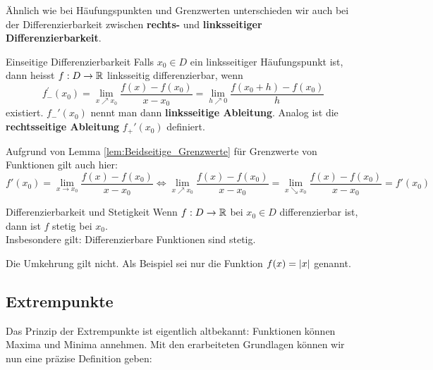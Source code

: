 Ähnlich wie bei Häufungspunkten und Grenzwerten unterschieden wir auch bei der Differenzierbarkeit zwischen \textbf{rechts-} und \textbf{linksseitiger Differenzierbarkeit}. 
\begin{definition}{Einseitige Differenzierbarkeit}{}
Falls $x_0 \in D$ ein linksseitiger Häufungspunkt ist, dann heisst $f:D \to \mathbb{R}$ linksseitig differenzierbar, wenn
$$f_{-}^{\prime}\left(x_{0}\right)=\lim _{x \nearrow x_{0}} \frac{f(x)-f\left(x_{0}\right)}{x-x_{0}}=\lim _{h \nearrow 0} \frac{f\left(x_{0}+h\right)-f\left(x_{0}\right)}{h}$$
existiert. $f_-'(x_0)$ nennt man dann \textbf{linksseitige Ableitung}. Analog ist die \textbf{rechtsseitige Ableitung} $f_+'(x_0)$ definiert.
\end{definition}
\begin{remark}
Aufgrund von Lemma \ref{lem:Beidseitige_Grenzwerte} für Grenzwerte von Funktionen gilt auch hier: $$f'(x_0)=\lim_{x \to x_0}\frac{f(x)-f(x_0)}{x-x_0} \Longleftrightarrow \lim_{x \nearrow x_0}\frac{f(x)-f\left(x_{0}\right)}{x-x_{0}} = \lim_{x \searrow x_0}\frac{f(x)-f\left(x_{0}\right)}{x-x_{0}}=f'(x_0)$$
\end{remark}
\begin{lemma}{Differenzierbarkeit und Stetigkeit}{}
Wenn $f:D \to \mathbb{R}$ bei $x_0 \in D$ differenzierbar ist, dann ist $f$ stetig bei $x_0$.\\ Insbesondere gilt: Differenzierbare Funktionen sind stetig.
\end{lemma}
\begin{remark}
Die Umkehrung gilt nicht. Als Beispiel sei nur die Funktion $f(x)=\left|x\right|$ genannt.
\end{remark}

\subsection{Extrempunkte}
Das Prinzip der Extrempunkte ist eigentlich altbekannt: Funktionen können Maxima und Minima annehmen. Mit den erarbeiteten Grundlagen können wir nun eine präzise Definition geben:

